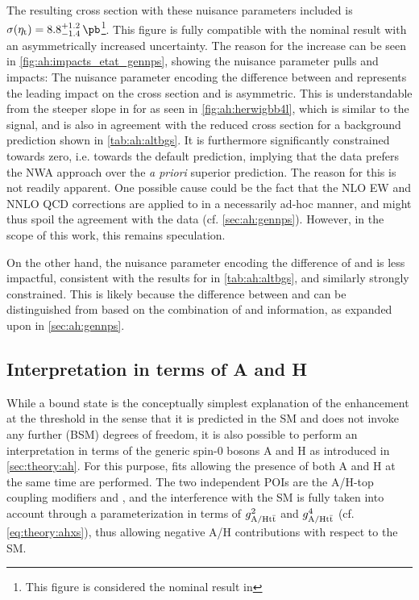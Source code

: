 The resulting \etat cross section with these nuisance parameters included is $\sigetat = 8.8^{+1.2}_{-1.4} \, \si{\pb}$\footnote{This figure is considered the nominal result in }. This figure is fully compatible with the nominal result with an asymmetrically increased uncertainty. The reason for the increase can be seen in \cref{fig:ah:impacts_etat_gennps}, showing the nuisance parameter pulls and impacts: The nuisance parameter encoding the difference between \bbfourl and \tttWsum represents the leading impact on the \etat cross section and is asymmetric. This is understandable from the steeper slope in \chel for \bbfourl as seen in \cref{fig:ah:herwigbb4l}, which is similar to the \etat signal, and is also in agreement with the reduced \etat cross section for a \bbfourl background prediction shown in \cref{tab:ah:altbgs}. It is furthermore significantly constrained towards zero, i.e. towards the default \tttWsum prediction, implying that the data prefers the NWA approach over the \textit{a priori} superior \bbfourl prediction. The reason for this is not readily apparent. One possible cause could be the fact that the NLO EW and NNLO QCD corrections are applied to \bbfourl in a necessarily ad-hoc manner, and might thus spoil the agreement with the data (cf. \cref{sec:ah:gennps}). However, in the scope of this work, this remains speculation.

On the other hand, the nuisance parameter encoding the difference of \pythia and \herwig is less impactful, consistent with the results for \herwig in \cref{tab:ah:altbgs}, and similarly strongly constrained. This is likely because the difference between \pythia and \herwig can be distinguished from \etat based on the combination of \mtt and \chel information, as expanded upon in \cref{sec:ah:gennps}.

\subsection{Interpretation in terms of A and H}
\label{sec:ah:bestfitah}

While a \ttbar bound state is the conceptually simplest explanation of the enhancement at the \ttbar threshold in the sense that it is predicted in the SM and does not invoke any further (BSM) degrees of freedom, it is also possible to perform an interpretation in terms of the generic spin-0 bosons A and H as introduced in \cref{sec:theory:ah}. 
For this purpose, fits allowing the presence of both A and H at the same time are performed. The two independent POIs are the A/H-top coupling modifiers \gAtt and \gHtt, and the interference with the SM is fully taken into account through a parameterization in terms of $g_{\mathrm{A/H t \bar{t}}}^2$ and $g_{\mathrm{A/H t \bar{t}}}^4$ (cf. \cref{eq:theory:ahxs}), thus allowing negative A/H contributions with respect to the SM.

